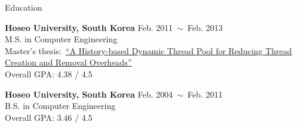 \documentclass{resume} %
\begin{document}


\begin{rSection}{Education}

{\bf Hoseo University, South Korea} \hfill Feb. 2011~$\sim$~Feb. 2013 \\
M.S. in Computer Engineering \\
Master's thesis:~\href{http://dlibrary.hoseo.ac.kr/search/searchDetail.do?rec_key=SH1_000000950591}
{\footnotesize ``A History-based Dynamic Thread Pool for Reducing Thread Creation and Removal Overheads''} \\
Overall GPA: 4.38 / 4.5

{\bf Hoseo University, South Korea} \hfill Feb. 2004~$\sim$~Feb. 2011 \\
B.S. in Computer Engineering \\
Overall GPA: 3.46 / 4.5

\end{rSection}
\end{document}
